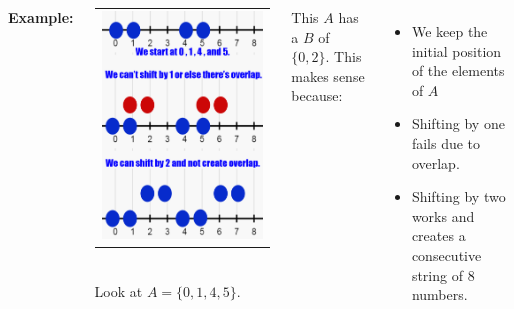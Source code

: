 \documentclass[margin=10mm]{tikzposter}
\theoremstyle{dotless}
\begin{document}
\begin{columns}
{ \textcolor{colorTwo}{\textbf{Example:} }


 \begin{center}
      \begin{tabular}{c}
     \includegraphics[scale=0.5]{numberline0145.png} \\
 \end{tabular}\\
    Look at $A = \{ 0,1,4,5 \}$. \\
 \end{center}
 
 \vspace{12pt}
 
 This $A$ has a $B$ of $ \{0,2 \}$. This makes sense because:
 \begin{itemize}
     \item We keep the initial position of the elements of $A$
     \item Shifting by one fails due to overlap.
     \item Shifting by two works and creates a consecutive string of 8 numbers.
 \end{itemize} 
 
}
\end{columns}
\end{document}

